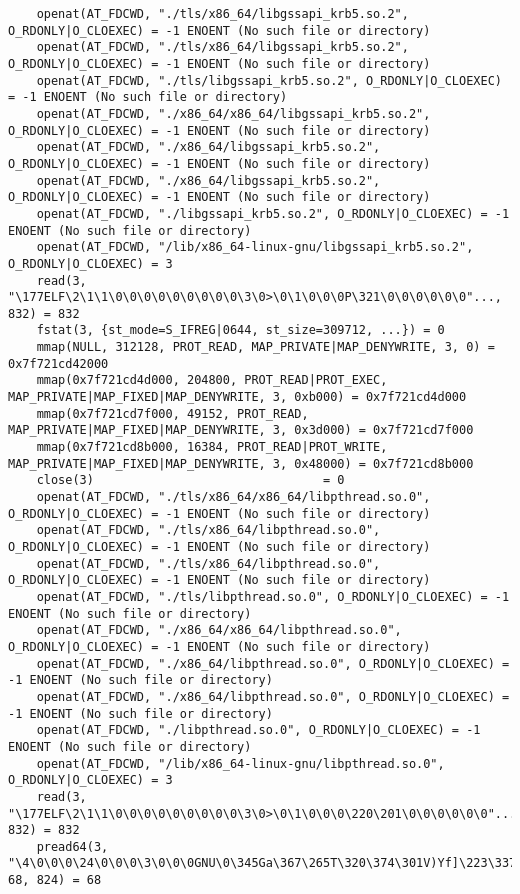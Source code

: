\documentclass[pdf, unicode, 12pt, a4paper,oneside,fleqn]{article}
\begin{document}
{\begin{verbatim}
    openat(AT_FDCWD, "./tls/x86_64/libgssapi_krb5.so.2", O_RDONLY|O_CLOEXEC) = -1 ENOENT (No such file or directory)
    openat(AT_FDCWD, "./tls/x86_64/libgssapi_krb5.so.2", O_RDONLY|O_CLOEXEC) = -1 ENOENT (No such file or directory)
    openat(AT_FDCWD, "./tls/libgssapi_krb5.so.2", O_RDONLY|O_CLOEXEC) = -1 ENOENT (No such file or directory)
    openat(AT_FDCWD, "./x86_64/x86_64/libgssapi_krb5.so.2", O_RDONLY|O_CLOEXEC) = -1 ENOENT (No such file or directory)
    openat(AT_FDCWD, "./x86_64/libgssapi_krb5.so.2", O_RDONLY|O_CLOEXEC) = -1 ENOENT (No such file or directory)
    openat(AT_FDCWD, "./x86_64/libgssapi_krb5.so.2", O_RDONLY|O_CLOEXEC) = -1 ENOENT (No such file or directory)
    openat(AT_FDCWD, "./libgssapi_krb5.so.2", O_RDONLY|O_CLOEXEC) = -1 ENOENT (No such file or directory)
    openat(AT_FDCWD, "/lib/x86_64-linux-gnu/libgssapi_krb5.so.2", O_RDONLY|O_CLOEXEC) = 3
    read(3, "\177ELF\2\1\1\0\0\0\0\0\0\0\0\0\3\0>\0\1\0\0\0P\321\0\0\0\0\0\0"..., 832) = 832
    fstat(3, {st_mode=S_IFREG|0644, st_size=309712, ...}) = 0
    mmap(NULL, 312128, PROT_READ, MAP_PRIVATE|MAP_DENYWRITE, 3, 0) = 0x7f721cd42000
    mmap(0x7f721cd4d000, 204800, PROT_READ|PROT_EXEC, MAP_PRIVATE|MAP_FIXED|MAP_DENYWRITE, 3, 0xb000) = 0x7f721cd4d000
    mmap(0x7f721cd7f000, 49152, PROT_READ, MAP_PRIVATE|MAP_FIXED|MAP_DENYWRITE, 3, 0x3d000) = 0x7f721cd7f000
    mmap(0x7f721cd8b000, 16384, PROT_READ|PROT_WRITE, MAP_PRIVATE|MAP_FIXED|MAP_DENYWRITE, 3, 0x48000) = 0x7f721cd8b000
    close(3)                                = 0
    openat(AT_FDCWD, "./tls/x86_64/x86_64/libpthread.so.0", O_RDONLY|O_CLOEXEC) = -1 ENOENT (No such file or directory)
    openat(AT_FDCWD, "./tls/x86_64/libpthread.so.0", O_RDONLY|O_CLOEXEC) = -1 ENOENT (No such file or directory)
    openat(AT_FDCWD, "./tls/x86_64/libpthread.so.0", O_RDONLY|O_CLOEXEC) = -1 ENOENT (No such file or directory)
    openat(AT_FDCWD, "./tls/libpthread.so.0", O_RDONLY|O_CLOEXEC) = -1 ENOENT (No such file or directory)
    openat(AT_FDCWD, "./x86_64/x86_64/libpthread.so.0", O_RDONLY|O_CLOEXEC) = -1 ENOENT (No such file or directory)
    openat(AT_FDCWD, "./x86_64/libpthread.so.0", O_RDONLY|O_CLOEXEC) = -1 ENOENT (No such file or directory)
    openat(AT_FDCWD, "./x86_64/libpthread.so.0", O_RDONLY|O_CLOEXEC) = -1 ENOENT (No such file or directory)
    openat(AT_FDCWD, "./libpthread.so.0", O_RDONLY|O_CLOEXEC) = -1 ENOENT (No such file or directory)
    openat(AT_FDCWD, "/lib/x86_64-linux-gnu/libpthread.so.0", O_RDONLY|O_CLOEXEC) = 3
    read(3, "\177ELF\2\1\1\0\0\0\0\0\0\0\0\0\3\0>\0\1\0\0\0\220\201\0\0\0\0\0\0"..., 832) = 832
    pread64(3, "\4\0\0\0\24\0\0\0\3\0\0\0GNU\0\345Ga\367\265T\320\374\301V)Yf]\223\337"..., 68, 824) = 68

\end{verbatim}}
\end{document}
